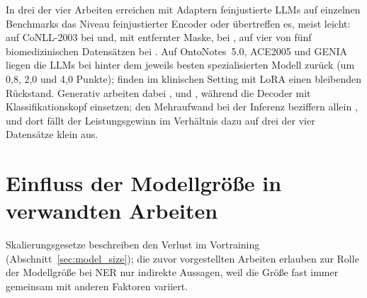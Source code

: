 In drei der vier Arbeiten erreichen mit Adaptern feinjustierte LLMs auf
einzelnen Benchmarks das Niveau feinjustierter Encoder oder übertreffen
es, meist leicht: auf CoNLL-2003 bei \textcite{zhan2026generativeNER} und, mit
entfernter Maske, bei \textcite{dukic2024lookingright}, auf vier von
fünf biomedizinischen Datensätzen bei \textcite{obeidat2025llm}.
Auf OntoNotes~5.0, ACE2005 und GENIA liegen die LLMs bei
\textcite{zhan2026generativeNER} hinter dem jeweils besten spezialisierten
Modell zurück (um 0,8, 2,0 und 4,0 Punkte);
\textcite{lu2024llmstruggle} finden im klinischen Setting mit LoRA
einen bleibenden Rückstand.
Generativ arbeiten dabei \textcite{zhan2026generativeNER},
\textcite{obeidat2025llm} und \textcite{lu2024llmstruggle}, während
\textcite{dukic2024lookingright} die Decoder mit Klassifikationskopf
einsetzen; den Mehraufwand bei der Inferenz beziffern allein
\textcite{obeidat2025llm}, und dort fällt der Leistungsgewinn im
Verhältnis dazu auf drei der vier Datensätze klein aus.


\section{Einfluss der Modellgröße in verwandten Arbeiten}
\label{sec:model_size_related}

Skalierungsgesetze beschreiben den Verlust im Vortraining
(Abschnitt~\ref{sec:model_size}); die zuvor vorgestellten Arbeiten
erlauben zur Rolle der Modellgröße bei NER nur indirekte Aussagen, weil
die Größe fast immer gemeinsam mit anderen Faktoren variiert.

